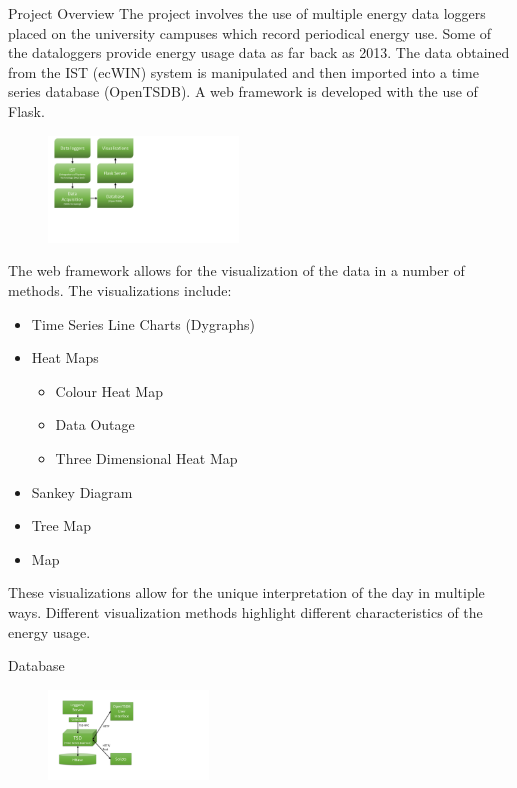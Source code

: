 \documentclass[8pt,xcolor={dvipsnames}]{beamer}
\begin{document}
{\begin{frame}{Project Overview}
 The project involves the use of multiple energy data loggers placed on the university campuses which record periodical energy use. Some of the dataloggers provide energy usage data as far back as 2013. The data obtained from the IST (ecWIN) system is manipulated and then imported into a time series database (OpenTSDB). A web framework is developed with the use of Flask.
 
 \begin{figure}
 	\begin{center}
 		\includegraphics[width=0.45\textwidth, trim=30 170 530 10, clip]{SystemOverviewGreenVertical}
 	\end{center}
 \end{figure}
The web framework allows for the visualization of the data in a number of methods.
The visualizations include:

\begin{itemize}
				\item Time Series Line Charts (Dygraphs)
				\item Heat Maps
				\begin{itemize}
					\item Colour Heat Map
					\item Data Outage
					\item Three Dimensional Heat Map
				\end{itemize}
				\item Sankey Diagram
				\item Tree Map
				\item Map
				
			\end{itemize}

These visualizations allow for the unique interpretation of the day in multiple ways. Different visualization methods highlight different characteristics of the energy usage.
\end{frame}


\begin{frame}{Database}

\begin{figure}
	\begin{center}
		\includegraphics[width=0.38\textwidth, trim=65 80 450 60, clip]{OpenTSDBNo}
	\end{center}
\end{figure}


\end{frame}}
\end{document}
